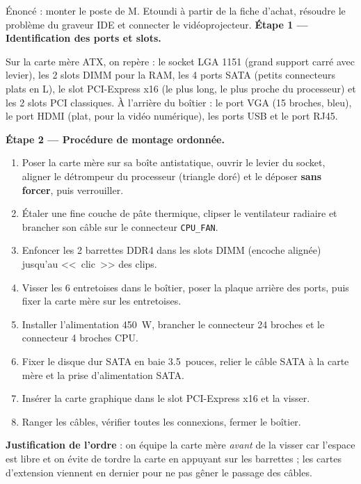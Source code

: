 \documentclass[11pt]{article}
\newcommand{\cle}[1]{{\popxbold\color{popdark}#1}}
\newcounter{popsec}
\newcounter{popsub}
\newcommand{\courssub}[1]{%
  \stepcounter{popsub}%
  \par\vspace{9pt}\noindent{\popxbold\fontsize{11.5}{13}\selectfont\color{popink}{\color{poporange}\thepopsec.\thepopsub}\hspace{6pt}#1}\par\nopagebreak\vspace{4pt}
}
\begin{document}
\courssub{Démarche et corrigé commenté}

\begin{exoresolu}
Énoncé : monter le poste de M. Etoundi à partir de la fiche d'achat, résoudre le problème du graveur IDE et connecter le vidéoprojecteur.
\tcblower
\textbf{Étape 1 — Identification des ports et slots.}

Sur la carte mère ATX, on repère : le \cle{socket} LGA 1151 (grand support carré avec levier), les 2 \cle{slots DIMM} pour la RAM, les 4 \cle{ports SATA} (petits connecteurs plats en L), le \cle{slot PCI-Express x16} (le plus long, le plus proche du processeur) et les 2 \cle{slots PCI} classiques. À l'arrière du boîtier : le port \cle{VGA} (15 broches, bleu), le port \cle{HDMI} (plat, pour la vidéo numérique), les ports USB et le port RJ45.

\textbf{Étape 2 — Procédure de montage ordonnée.}

\begin{enumerate}
  \item Poser la carte mère sur sa boîte antistatique, ouvrir le levier du socket, aligner le détrompeur du processeur (triangle doré) et le déposer \textbf{sans forcer}, puis verrouiller.
  \item Étaler une fine couche de pâte thermique, clipser le ventilateur radiaire et brancher son câble sur le connecteur \texttt{CPU\_FAN}.
  \item Enfoncer les 2 barrettes DDR4 dans les slots DIMM (encoche alignée) jusqu'au <<~clic~>> des clips.
  \item Visser les 6 entretoises dans le boîtier, poser la plaque arrière des ports, puis fixer la carte mère sur les entretoises.
  \item Installer l'alimentation \SI{450}{W}, brancher le connecteur 24 broches et le connecteur 4 broches CPU.
  \item Fixer le disque dur SATA en baie \SI{3,5}{pouces}, relier le câble SATA à la carte mère et la prise d'alimentation SATA.
  \item Insérer la carte graphique dans le slot PCI-Express x16 et la visser.
  \item Ranger les câbles, vérifier toutes les connexions, fermer le boîtier.
\end{enumerate}

\textbf{Justification de l'ordre} : on équipe la carte mère \emph{avant} de la visser car l'espace est libre et on évite de tordre la carte en appuyant sur les barrettes ; les cartes d'extension viennent en dernier pour ne pas gêner le passage des câbles.


\end{exoresolu}
\end{document}
